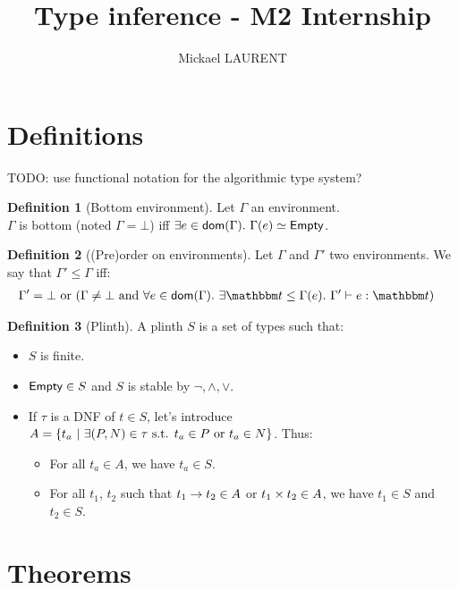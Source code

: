 \documentclass[a4paper]{article}
\title{\vspace{1.5cm}Type inference - M2 Internship}
\author{Mickael LAURENT}
\date{\vspace{-5ex}}
\theoremstyle{definition}
\newtheorem{definition}{Definition}
\begin{document}
  \maketitle

  \section{Definitions}

  TODO: use functional notation for the algorithmic type system?

    \begin{definition}[Bottom environment]
      Let $\Gamma$ an environment.\\
      $\Gamma$ is bottom (noted $\Gamma = \bot$) iff $\exists e\in\dom\Gamma.\ \Gamma(e)\simeq\Empty$.
    \end{definition}

    \begin{definition}[(Pre)order on environments]
    Let $\Gamma$ and $\Gamma'$ two environments. We say that $\Gamma' \leq \Gamma$ iff:
    \begin{align*}
        &\Gamma'=\bot \text{ or } (\Gamma\neq\bot \text{ and } \forall e \in \dom \Gamma.\ \exists \ts\leq \Gamma(e).\ \Gamma' \vdash e : \ts)
    \end{align*}
    \end{definition}

    \begin{definition}[Plinth]
      A plinth $S$ is a set of types such that:
      \begin{itemize}
        \item $S$ is finite.
        \item $\textsf{Empty} \in S$ and $S$ is stable by $\neg, \land, \vee$. 
        \item If $\tau$ is a DNF of $t\in S$, let's introduce $A=\{t_a ~|~ \exists (P,N) \in \tau \text{ s.t. } t_a \in P \text{ or } t_a \in N \}$. Thus:
        \begin{itemize}
          \item For all $t_a \in A$, we have $t_a \in S$.
          \item For all $t_1$, $t_2$ such that $t_1\to t_2 \in A$ or $t_1\times t_2 \in A$,
          we have $t_1 \in S$ and $t_2 \in S$.
        \end{itemize}
      \end{itemize}
    \end{definition}

  \section{Theorems}
\end{document}
